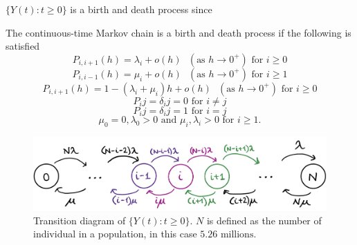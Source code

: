 $\{Y(t):t \geq 0\}$ is a birth and death process since 


The continuous-time Markov chain is a birth and death process if the following is satisfied
$$P_{i, i+1}(h) = \lambda_i + o(h) \text{ }(\text{as } h\rightarrow 0^+) \text{ for } i \geq 0$$
$$P_{i, i-1}(h) = \mu_i + o(h) \text{ }(\text{as } h\rightarrow 0^+) \text{ for } i \geq 1$$
$$P_{i, i+1}(h) = 1 - (\lambda_i + \mu_i)h+ o(h) \text{ }(\text{as } h\rightarrow 0^+) \text{ for } i \geq 0$$
$$ P_ij = \delta_ij = 0 \text{ for } i \neq j $$
$$ P_ij = \delta_ij = 1 \text{ for } i = j $$
$$\mu_0 = 0, \lambda_0 > 0\text{ and } \mu_i, \lambda_i > 0 \text{ for } i\geq1.$$



\begin{figure}
    \centering
    \includegraphics[width=140mm]{TransDiag1F.png}
    \caption{Transition diagram of $\{Y(t):t \geq 0 \}$. $N$ is defined as the number of individual in a population, in this case $5.26 \text{ millions.}$}
    \label{plot_2a}
\end{figure}